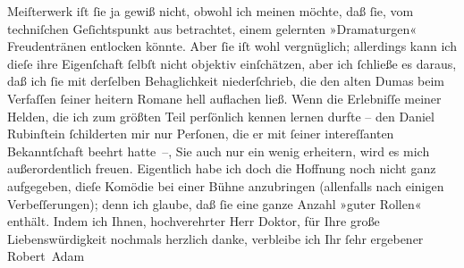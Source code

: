 \begin{ledgroupsized}[t]{13cm}
               Meiſterwerk iſt ſie ja gewiß nicht, obwohl ich meinen möchte, daß ſie, vom
               techniſchen Geſichtspunkt aus betrachtet, einem gelernten »Dramaturgen« Freudentränen
               entlocken könnte. Aber ſie iſt {\pb}wohl
               vergnüglich; allerdings kann ich dieſe ihre Eigenſchaft ſelbſt nicht objektiv
               einſchätzen, aber ich ſchließe es daraus, daß ich ſie mit derſelben Behaglichkeit
               niederſchrieb, die den alten Dumas beim
               Verfaſſen ſeiner heitern Romane hell auflachen ließ. Wenn die Erlebniſſe meiner
               Helden, die ich zum größten Teil perſönlich kennen lernen durfte – den Daniel
               Rubinſtein ſchilderten mir nur Perſonen, die er mit ſeiner intereſſanten
               Bekanntſchaft beehrt hatte –, Sie auch nur ein wenig erheitern, wird es mich
               außerordentlich freuen. Eigentlich habe ich doch die Hoffnung noch nicht ganz
               aufgegeben, dieſe Komödie bei einer Bühne anzubringen (allenfalls nach einigen
               Verbeſſerungen); denn ich glaube, daß ſie eine ganze Anzahl »guter Rollen«
               enthält.\pend
           \pstart
           Indem ich Ihnen, hochverehrter Herr Doktor, für Ihre große Liebenswürdigkeit nochmals
               herzlich danke, verbleibe ich Ihr ſehr ergebener\pend
           \pstart \spacefill\mbox{Robert Adam}\pend{}
         
         \endnumbering{}\end{ledgroupsized}  \newcommand{\dateiname}{L02209}\newcommand{\titel}{Robert Adam an Arthur Schnitzler, 22. 6. 1915}\newcommand{\editorInnen}{Martin Anton Müller und Gerd-Hermann Susen}
      